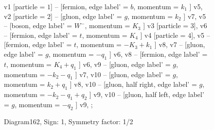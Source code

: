 \documentclass{revtex4}
\begin{document}
\begin{figure}[!htb]
\begin{center}
{    %
v1 [particle = \(1\)] -- [fermion, edge label' = \(b\), momentum = \(k_{1}\) ] v5, 
v2 [particle = \(2\)] -- [gluon, edge label' = \(g\), momentum = \(k_{2}\) ] v7, 
v5 -- [boson, edge label' = \(W^{-}\), momentum = \(K_{3}\) ] v3 [particle = \(3\)], 
v6 -- [fermion, edge label' = \(t\), momentum = \(K_{4}\) ] v4 [particle = \(4\)], 
v5 -- [fermion, edge label' = \(t\), momentum = \(-K_{3} + k_{1}\) ] v8, 
v7 -- [gluon, edge label' = \(g\), momentum = \(-q_{1}\) ] v6, 
v8 -- [fermion, edge label' = \(t\), momentum = \(K_{4} + q_{1}\) ] v6, 
v9 -- [gluon, edge label' = \(g\), momentum = \(-k_{2} - q_{1}\) ] v7, 
v10 -- [gluon, edge label' = \(g\), momentum = \(k_{2} + q_{1}\) ] v8, 
v10 -- [gluon, half right, edge label' = \(g\), momentum = \(-k_{2} - q_{1} + q_{2}\) ] v9, 
v10 -- [gluon, half left, edge label' = \(g\), momentum = \(-q_{2}\) ] v9, 
};
\end{center}
\caption{Diagram162, Sign: 1, Symmetry factor: 1/2}
\end{figure}
\newpage
\end{document}
